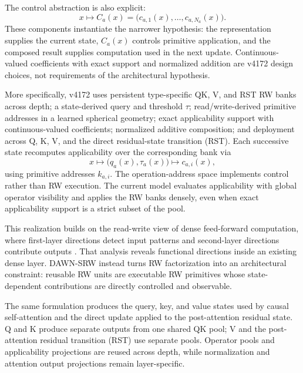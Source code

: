 \documentclass{article}
\newcommand{\DAWN}{DAWN-SRW}
\begin{document}
The control abstraction is also explicit:
\begin{equation}
x\longmapsto C_a(x)
=\big(c_{a,1}(x),\ldots,c_{a,N_a}(x)\big).
\label{eq:intro_control}
\end{equation}
These components instantiate the narrower hypothesis: the representation
supplies the current state, \(C_a(x)\) controls primitive application, and the
composed result supplies computation used in the next update. Continuous-valued
coefficients with exact support and normalized addition are v4172 design
choices, not requirements of the architectural hypothesis.

More specifically, v4172 uses persistent type-specific QK, V, and RST RW banks
across depth; a state-derived query and threshold \(\tau\); read/write-derived
primitive addresses in a learned spherical geometry; exact applicability
support with continuous-valued coefficients; normalized additive composition;
and deployment across Q, K, V, and the direct residual-state transition (RST).
Each successive state recomputes applicability over the corresponding bank via
\[
x\longmapsto\big(q_a(x),\tau_a(x)\big)
\longmapsto c_{a,i}(x),
\]
using primitive addresses \(k_{a,i}\). The operation-address space implements
control rather than RW execution. The current model evaluates applicability with
global operator visibility and applies the RW banks densely, even when exact
applicability support is a strict subset of the pool.

This realization builds on the read-write view of dense feed-forward
computation, where first-layer directions detect input patterns and second-layer
directions contribute outputs \cite{geva2021transformer}. That analysis reveals
functional directions inside an existing dense layer. \DAWN{} instead turns RW
factorization into an architectural constraint: reusable RW units are
executable RW primitives whose state-dependent contributions are
directly controlled and observable.

The same formulation produces the query, key, and value states used by causal
self-attention and the direct update applied to the post-attention residual
state.
Q and K produce separate outputs from one shared QK pool; V and the
post-attention residual transition (RST) use separate pools. Operator pools and
applicability projections are reused across depth, while normalization and
attention output projections remain layer-specific.
\end{document}
